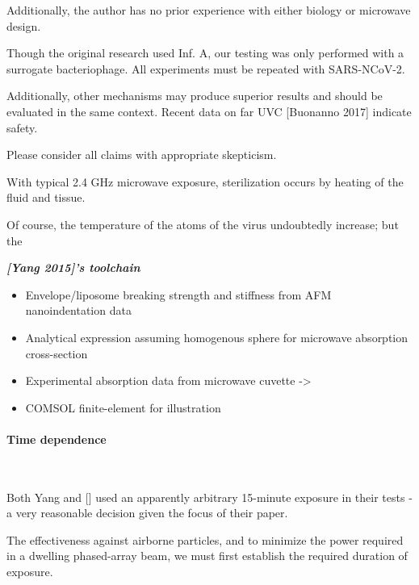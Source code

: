 \documentclass[fleqn,10pt]{article}
\begin{document}
Additionally, the author has no prior experience with either biology or microwave design. 

Though the original research used Inf. A, our testing was only performed with a surrogate bacteriophage. All experiments must be repeated with SARS-NCoV-2.

Additionally, other mechanisms may produce superior results and should be evaluated in the same context. Recent data on far UVC [Buonanno 2017] indicate safety.

Please consider all claims with appropriate skepticism.


\begin{multicols}{1}


With typical 2.4 GHz microwave exposure, sterilization occurs by heating of the fluid and tissue.

Of course, the temperature of the atoms of the virus undoubtedly increase; but the 

\begin{toolchain}
	{\it \bf [Yang 2015]'s toolchain}
	\begin{itemize}
	\item Envelope/liposome breaking strength and stiffness from AFM nanoindentation data
	\item Analytical expression assuming homogenous sphere for microwave absorption cross-section
	\item Experimental absorption data from microwave cuvette -> 
	\item COMSOL finite-element for illustration
	\end{itemize}
\end{toolchain}

\end{multicols}






\clearpage
\paragraph{\textbf{Time dependence}}\


Both Yang and [] used an apparently arbitrary 15-minute exposure in their tests - a very reasonable decision given the focus of their paper. 

The effectiveness against airborne particles, and to minimize the power required in a dwelling phased-array beam, we must first establish the required duration of exposure.
\end{document}
